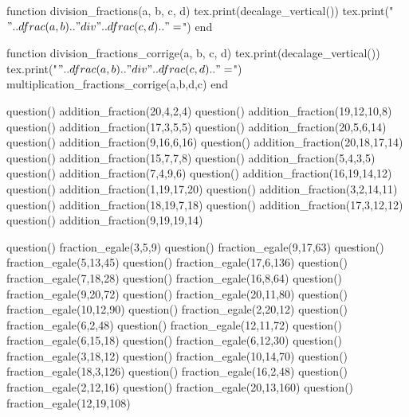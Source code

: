 \documentclass["../Cours.tex"]{subfiles}
\begin{document}
\begin{luacode}
    function division_fractions(a, b, c, d)
        tex.print(decalage_vertical())
        tex.print("$" .. dfrac(a,b) .. "\\div" .. dfrac(c,d) .. "=$")
    end

    function division_fractions_corrige(a, b, c, d)
        tex.print(decalage_vertical())
        tex.print("$" .. dfrac(a,b) .. "\\div" .. dfrac(c,d) .. "=$")
        multiplication_fractions_corrige(a,b,d,c)
    end
\end{luacode}

\clearpage
\EXERCICES

\begin{questions}

    \vspace{-1.5em}
        \begin{multicols}{3}\small
        \begin{luacode}
            question() addition_fraction(20,4,2,4)
            question() addition_fraction(19,12,10,8)
            question() addition_fraction(17,3,5,5)
            question() addition_fraction(20,5,6,14)
            question() addition_fraction(9,16,6,16)
            question() addition_fraction(20,18,17,14)
            question() addition_fraction(15,7,7,8)
            question() addition_fraction(5,4,3,5)
            question() addition_fraction(7,4,9,6)
            question() addition_fraction(16,19,14,12)
            question() addition_fraction(1,19,17,20)
            question() addition_fraction(3,2,14,11)
            question() addition_fraction(18,19,7,18)
            question() addition_fraction(17,3,12,12)
            question() addition_fraction(9,19,19,14)
        \end{luacode}
        \end{multicols}
    
    \vspace{-1.5em}
        \begin{multicols}{3}\small
        \begin{luacode}
            question() fraction_egale(3,5,9)
            question() fraction_egale(9,17,63)
            question() fraction_egale(5,13,45)
            question() fraction_egale(17,6,136)
            question() fraction_egale(7,18,28)
            question() fraction_egale(16,8,64)
            question() fraction_egale(9,20,72)
            question() fraction_egale(20,11,80)
            question() fraction_egale(10,12,90)
            question() fraction_egale(2,20,12)
            question() fraction_egale(6,2,48)
            question() fraction_egale(12,11,72)
            question() fraction_egale(6,15,18)
            question() fraction_egale(6,12,30)
            question() fraction_egale(3,18,12)
            question() fraction_egale(10,14,70)
            question() fraction_egale(18,3,126)
            question() fraction_egale(16,2,48)
            question() fraction_egale(2,12,16)
            question() fraction_egale(20,13,160)
            question() fraction_egale(12,19,108)
        \end{luacode}
        \end{multicols}


\end{questions}
\end{document}
